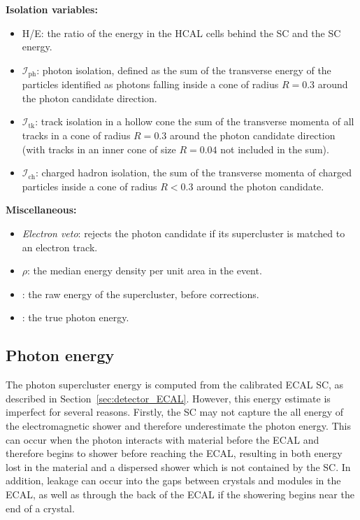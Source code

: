 \textbf{Isolation variables:}
\begin{itemize}[noitemsep]
  \item H/E: the ratio of the energy in the HCAL cells behind the SC
    and the SC energy.
  \item \emph{$\mathcal{I}_{\text{ph}}$}: 
    photon isolation,
    defined as the sum of the transverse energy of the particles
    identified as photons falling inside a cone of radius
    $R=0.3$
    around the photon candidate direction.
  \item \emph{$\mathcal{I}_{\text{tk}}$}: 
    track isolation in a hollow cone
    the sum of the transverse momenta
    of all tracks in a cone of radius $R=0.3$
    around the photon candidate direction (with tracks in an
    inner cone of size $R=0.04$ not included in the sum).
  \item \emph{$\mathcal{I}_{\text{ch}}$}: 
    charged hadron isolation,
    the sum of the transverse momenta of
    charged particles inside a cone of radius $R<0.3$ around the
    photon candidate.
\end{itemize}

\textbf{Miscellaneous:}
\begin{itemize}[noitemsep]
  \item \emph{Electron veto}: rejects the photon candidate if its 
    supercluster is matched to an electron track.
  \item \emph{$\rho$}: the median energy  density per unit area in the event.
  \item \emph{\Eraw}: the raw energy of the supercluster, before corrections.
  \item \emph{\Etrue}: the true photon energy.
\end{itemize}

\subsection{Photon energy}

The photon supercluster energy is computed from the calibrated ECAL SC, as described in Section~\ref{sec:detector_ECAL}.
However, this energy estimate is imperfect for several reasons.
Firstly, the SC may not capture the all energy of the electromagnetic shower and therefore underestimate the photon energy.
This can occur when the photon interacts with material before the ECAL and therefore begins to shower before reaching the ECAL, 
resulting in both energy lost in the material and a dispersed shower which is not contained by the SC.
In addition, leakage can occur into the gaps between crystals and modules in the ECAL, 
as well as through the back of the ECAL if the showering begins near the end of a crystal.

